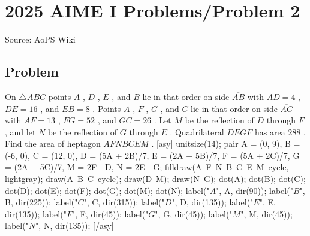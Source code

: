 \documentclass[12pt]{article}
\begin{document}
\section*{{2025 AIME I Problems/Problem 2}}
Source: AoPS Wiki

\subsection*{Problem}
On $\triangle ABC$ points $A$ , $D$ , $E$ , and $B$ lie in that order on side $\overline{AB}$ with $AD = 4$ , $DE = 16$ , and $EB = 8$ . Points $A$ , $F$ , $G$ , and $C$ lie in that order on side $\overline{AC}$ with $AF = 13$ , $FG = 52$ , and $GC = 26$ . Let $M$ be the reflection of $D$ through $F$ , and let $N$ be the reflection of $G$ through $E$ . Quadrilateral $DEGF$ has area $288$ . Find the area of heptagon $AFNBCEM$ . [asy] unitsize(14); pair A = (0, 9), B = (-6, 0), C = (12, 0), D = (5A + 2B)/7, E = (2A + 5B)/7, F = (5A + 2C)/7, G = (2A + 5C)/7, M = 2F - D, N = 2E - G; filldraw(A--F--N--B--C--E--M--cycle, lightgray); draw(A--B--C--cycle); draw(D--M); draw(N--G); dot(A); dot(B); dot(C); dot(D); dot(E); dot(F); dot(G); dot(M); dot(N); label("$A$", A, dir(90)); label("$B$", B, dir(225)); label("$C$", C, dir(315)); label("$D$", D, dir(135)); label("$E$", E, dir(135)); label("$F$", F, dir(45)); label("$G$", G, dir(45)); label("$M$", M, dir(45)); label("$N$", N, dir(135)); [/asy]
\end{document}
